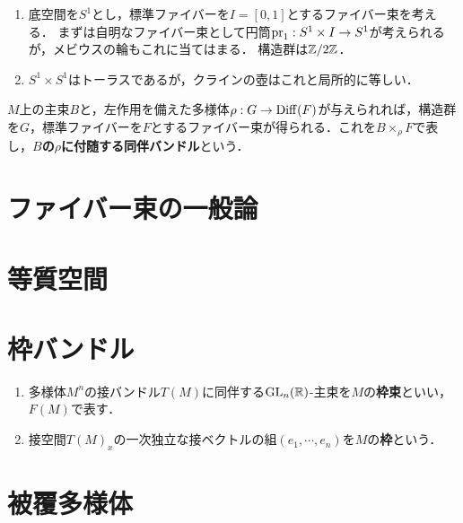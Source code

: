 \documentclass[uplatex,dvipdfmx]{jsreport}
\begin{document}
\begin{example}\mbox{}
    \begin{enumerate}
        \item 底空間を$S^1$とし，標準ファイバーを$I=[0,1]$とするファイバー束を考える．
        まずは自明なファイバー束として円筒$\mathrm{pr}_1:S^1\times I\to S^1$が考えられるが，メビウスの輪もこれに当てはまる．
        構造群は$\mathbb{Z}/2\mathbb{Z}$．
        \item $S^1\times S^1$はトーラスであるが，クラインの壺はこれと局所的に等しい．
    \end{enumerate}
\end{example}

\begin{definition}
    $M$上の主束$B$と，左作用を備えた多様体$\rho:G\to\mathrm{Diff}(F)$が与えられれば，構造群を$G$，標準ファイバーを$F$とするファイバー束が得られる．これを$B\times_\rho F$で表し，\textbf{$B$の$\rho$に付随する同伴バンドル}という．
\end{definition}

\section{ファイバー束の一般論}

\section{等質空間}

\section{枠バンドル}

\begin{definition}\mbox{}
    \begin{enumerate}
        \item 多様体$M^n$の接バンドル$T(M)$に同伴する$\mathrm{GL}_n(\mathbb{R})$-主束を$M$の\textbf{枠束}といい，$F(M)$で表す．
        \item 接空間$T(M)_x$の一次独立な接ベクトルの組$(e_1,\cdots,e_n)$を$M$の\textbf{枠}という．
    \end{enumerate}
\end{definition}

\section{被覆多様体}

\begin{tcolorbox}[colframe=ForestGreen, colback=ForestGreen!10!white,breakable,colbacktitle=ForestGreen!40!white,coltitle=black,fonttitle=\bfseries\sffamily,
title=]
    
\end{tcolorbox}
\end{document}
